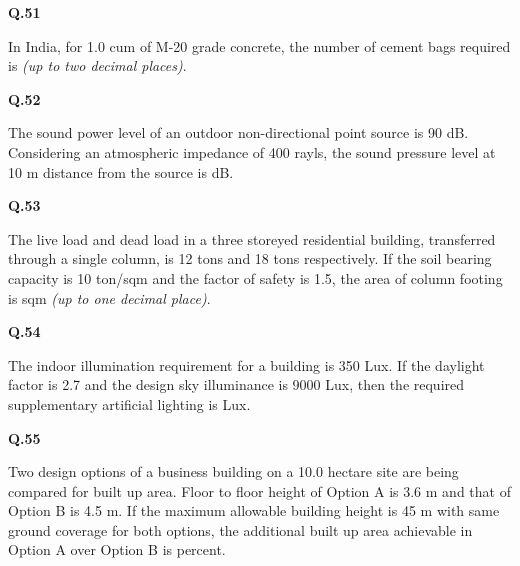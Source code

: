 \documentclass[journal,12pt,onecolumn]{IEEEtran}
\theoremstyle{remark}
\begin{document}
\vspace{1.5cm}

\noindent
\textbf{Q.51}\hspace{0.5cm}\parbox[t]{14.5cm}{ In India, for 1.0 cum of M-20 grade concrete, the number of cement bags required is \underline{\hspace{3cm}} \emph{(up to two decimal places)}.}

\vspace{1.5cm}

\noindent
\textbf{Q.52} \hspace{0.5cm}\parbox[t]{14.5cm}{The sound power level of an outdoor non-directional point source is 90 dB. Considering an atmospheric impedance of 400 rayls, the sound pressure level at 10 m distance from the source is \underline{\hspace{3cm}} dB.}

\vspace{1.5cm}

\noindent
\textbf{Q.53}\hspace{0.5cm}\parbox[t]{14.5cm}{ The live load and dead load in a three storeyed residential building, transferred through a single column, is 12 tons and 18 tons respectively. If the soil bearing capacity is 10 ton/sqm and the factor of safety is 1.5, the area of column footing is \underline{\hspace{3cm}} sqm \emph{(up to one decimal place)}.}

\vspace{1.5cm}

\noindent
\textbf{Q.54}\hspace{0.5cm}\parbox[t]{14.5cm}{ The indoor illumination requirement for a building is 350 Lux. If the daylight factor is 2.7 and the design sky illuminance is 9000 Lux, then the required supplementary artificial lighting is \underline{\hspace{3cm}} Lux.}

\vspace{1.5cm}

\noindent
    \textbf{Q.55} \hspace{0.5cm} \parbox[t]{14.5cm}{Two design options of a business building on a 10.0 hectare site are being compared for built up area. Floor to floor height of Option A is 3.6 m and that of Option B is 4.5 m. If the maximum allowable building height is 45 m with same ground coverage for both options, the additional built up area achievable in Option A over Option B is \underline{\hspace{3cm}} percent.}
\end{document}
